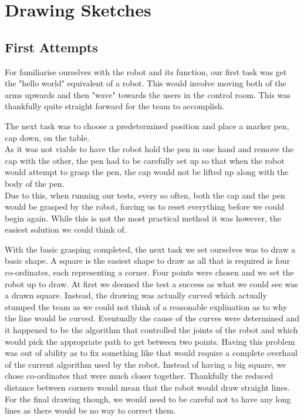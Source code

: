 \documentclass{l3proj}
\begin{document}
\section{Drawing Sketches}

\subsection{First Attempts}
For familiarise ourselves with the robot and its function, our first task was get the "hello world" equivalent of a robot. This would involve moving both of the arms upwards and then "wave" towards the users in the control room. This was thankfully quite straight forward for the team to accomplish.

The next task was to choose a predetermined position and place a marker pen, cap down, on the table.\\
As it was not viable to have the robot hold the pen in one hand and remove the cap with the other, the pen had to be carefully set up so that when the robot would attempt to grasp the pen, the cap would not be lifted up along with the body of the pen.\\
Due to this, when running our tests, every so often, both the cap and the pen would be grasped by the robot, forcing us to reset everything before we could begin again. While this is not the most practical method it was however, the easiest solution we could think of.

With the basic grasping completed, the next task we set ourselves was to draw a basic shape. A square is the easiest shape to draw as all that is required is four co-ordinates, each representing a corner. Four points were chosen and we set the robot up to draw. At first we deemed the test a success as what we could see was a drawn square. Instead, the drawing was actually curved which actually stumped the team as we could not think of a reasonable explination as to why the line would be curved. Eventually the cause of the curves were determined and it happened to be the algorithm that controlled the joints of the robot and which would pick the appropriate path to get between two points. Having this problem was out of ability as to fix something like that would require a complete overhaul of the current algorithm used by the robot. Instead of having a big square, we chose co-ordinates that were much closer together. Thankfully the reduced distance between corners would mean that the robot would draw straight lines.\\
For the final drawing though, we would need to be careful not to have any long lines as there would be no way to correct them.
\end{document}
